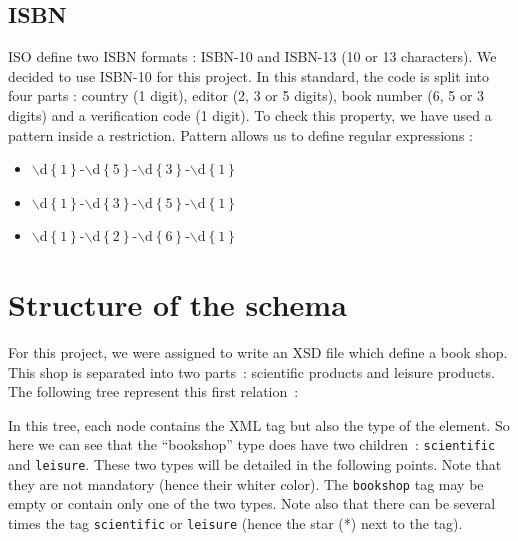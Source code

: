 \documentclass{article}
\begin{document}
  \subsection{ISBN}
    \label{sec:isbn}
    ISO define two ISBN formats : ISBN-10 and ISBN-13 (10 or 13 characters). We decided to use ISBN-10 for this project. In this standard, the code is split into four parts : country (1 digit), editor (2, 3 or 5 digits), book number (6, 5 or 3 digits) and a verification code (1 digit). To check this property, we have used a pattern inside a restriction. Pattern allows us to define regular expressions :
    \begin{itemize}
    \item $\backslash$d$\left\{ 1\right\}$-$\backslash$d$\left\{ 5 \right\}$-$\backslash$d$\left\{ 3 \right\}$-$\backslash$d$\left\{ 1 \right\}$
    \item $\backslash$d$\left\{ 1 \right\}$-$\backslash$d$\left\{ 3 \right\}$-$\backslash$d$\left\{ 5 \right\}$-$\backslash$d$\left\{ 1 \right\}$
    \item $\backslash$d$\left\{ 1 \right\}$-$\backslash$d$\left\{ 2 \right\}$-$\backslash$d$\left\{ 6 \right\}$-$\backslash$d$\left\{ 1 \right\}$
    \end{itemize}
  
  
\section{Structure of the schema}
  For this project, we were assigned to write an XSD file which define a book shop. This shop is separated into two parts~: scientific products and leisure products. The following tree represent this first relation~:
  \begin{center}
  \end{center}
  In this tree, each node contains the XML tag but also the type of the element.
  So here we can see that the ``bookshop'' type does have two children~: \verb|scientific| and \verb|leisure|. These two types will be detailed in the following points.
  Note that they are not mandatory (hence their whiter color).  The \verb|bookshop| tag may be empty or contain only one of the two types.  Note also that there can be several times the tag \verb|scientific| or \verb|leisure| (hence the star (*) next to the tag).
  
\end{document}
